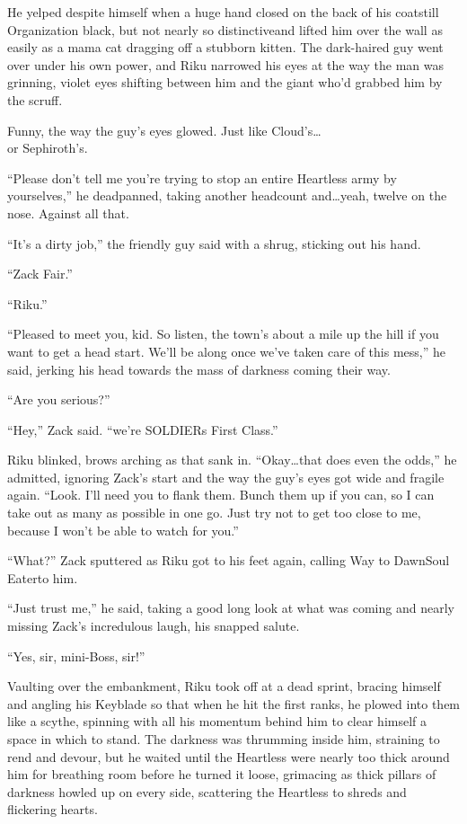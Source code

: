 He yelped despite himself when a huge hand closed on the back of his coat\textemdash still Organization black, but not nearly so distinctive\textemdash and lifted him over the wall as easily as a mama cat dragging off a stubborn kitten. The dark-haired guy went over under his own power, and Riku narrowed his eyes at the way the man was grinning, violet eyes shifting between him and the giant who'd grabbed him by the scruff.

Funny, the way the guy's eyes glowed. Just like Cloud's\ldots\\ or Sephiroth's.

``Please don't tell me you're trying to stop an entire Heartless army by yourselves,'' he deadpanned, taking another headcount and\ldots yeah, twelve on the nose. Against all that.

``It's a dirty job,'' the friendly guy said with a shrug, sticking out his hand. 

``Zack Fair.''

``Riku.''

``Pleased to meet you, kid. So listen, the town's about a mile up the hill if you want to get a head start. We'll be along once we've taken care of this mess,'' he said, jerking his head towards the mass of darkness coming their way.

``Are you serious?''

``Hey,'' Zack said. ``we're SOLDIERs First Class.''

Riku blinked, brows arching as that sank in. ``Okay\ldots that does even the odds,'' he admitted, ignoring Zack's start and the way the guy's eyes got wide and fragile again. ``Look. I'll need you to flank them. Bunch them up if you can, so I can take out as many as possible in one go. Just try not to get too close to me, because I won't be able to watch for you.''

``What?'' Zack sputtered as Riku got to his feet again, calling Way to Dawn\textemdash Soul Eater\textemdash to him.

``Just trust me,'' he said, taking a good long look at what was coming and nearly missing Zack's incredulous laugh, his snapped salute.

``Yes, sir, mini-Boss, sir!''

\scenechange

Vaulting over the embankment, Riku took off at a dead sprint, bracing himself and angling his Keyblade so that when he hit the first ranks, he plowed into them like a scythe, spinning with all his momentum behind him to clear himself a space in which to stand. The darkness was thrumming inside him, straining to rend and devour, but he waited until the Heartless were nearly too thick around him for breathing room before he turned it loose, grimacing as thick pillars of darkness howled up on every side, scattering the Heartless to shreds and flickering hearts.

